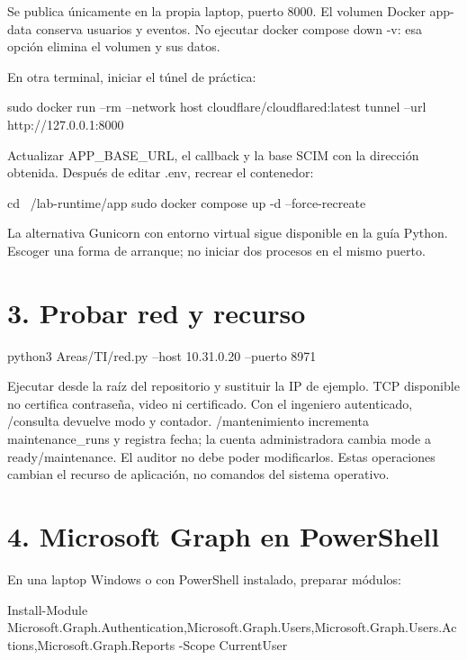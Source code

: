 \documentclass[12pt,a4paper]{article}
\begin{document}
Se publica únicamente en la propia laptop, puerto 8000. El volumen Docker app-data conserva usuarios y eventos. No ejecutar \textnormal{docker compose down -v}: esa opción elimina el volumen y sus datos.\par
En otra terminal, iniciar el túnel de práctica:\par
{}
\begin{Comandos}
sudo docker run --rm --network host cloudflare/cloudflared:latest tunnel --url http://127.0.0.1:8000
\end{Comandos}
Actualizar APP\_BASE\_URL, el callback y la base SCIM con la dirección obtenida. Después de editar \textnormal{.env}, recrear el contenedor:\par
{}
\begin{Comandos}
cd ~/lab-runtime/app
sudo docker compose up -d --force-recreate
\end{Comandos}
La alternativa Gunicorn con entorno virtual sigue disponible en la guía Python. Escoger una forma de arranque; no iniciar dos procesos en el mismo puerto.\par
{}\section*{3. Probar red y recurso}
\begin{Comandos}
python3 Areas/TI/red.py --host 10.31.0.20 --puerto 8971
\end{Comandos}
Ejecutar desde la raíz del repositorio y sustituir la IP de ejemplo. TCP disponible no certifica contraseña, video ni certificado. Con el ingeniero autenticado, \textnormal{/\allowbreak{}consulta} devuelve modo y contador. \textnormal{/\allowbreak{}mantenimiento} incrementa maintenance\_runs y registra fecha; la cuenta administradora cambia mode a ready/maintenance. El auditor no debe poder modificarlos. Estas operaciones cambian el recurso de aplicación, no comandos del sistema operativo.\par
{}\section*{4. Microsoft Graph en PowerShell}
En una laptop Windows o con PowerShell instalado, preparar módulos:\par
{}
\begin{Comandos}
Install-Module Microsoft.Graph.Authentication,Microsoft.Graph.Users,Microsoft.Graph.Users.Actions,Microsoft.Graph.Reports -Scope CurrentUser
\end{Comandos}
\end{document}
